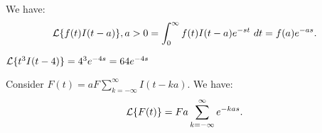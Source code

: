 \documentclass[../main/main.tex]{subfiles}
\begin{document}
\begin{theorem}
	We have: \[
		\mathcal{L} \{f(t) I(t-a)\} ,a>0 = \int^\infty_0 f(t) I(t-a) e^{-st}~dt = f(a)e^{-as}
	.\] 
\end{theorem}
\begin{example}
	$ \mathcal{L} \{t ^{3}I(t-4)\} = 4^{3}e^{-4s}=64 e^{-4s}$ 
\end{example}
\begin{example}
	Consider $F(t) = aF \sum_{k=-\infty}^{\infty} I(t-ka)$. We have: \[
		\mathcal{L} \{F(t)\}  = Fa \sum_{k=-\infty}^{\infty} e^{-kas}
	.\] 
\end{example}










\end{document}
